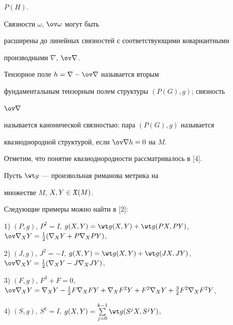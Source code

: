 $P(H)$. 


Связности $\omega$, $\ov\omega$ могут быть 


расширены до линейных связностей с соответствующими ковариантными 


производными $\nabla$, $\ov\nabla$. 


 


\begin{defn} 


Тензорное поле $h=\nabla-\ov\nabla$ называется вторым 


фундаментальным тензорным полем структуры $(P(G),g)$; связность 


$\ov\nabla$ 


называется канонической связностью; пара $(P(G),g)$ называется 


квазиоднородной структурой, если $\ov\nabla h=0$ на $M$. 


\end{defn} 


 


Отметим, что понятие квазиоднородности рассматривалось в [4]. 


 


Пусть $\wt g$ --- произвольная риманова метрика на


множестве $M$, $X,Y\in\frak X(M)$. 


Следующие примеры можно найти в [2]:


 


1) $(P,g)$, $P^2=I$, $g(X,Y)=\wt g(X,Y)+\wt g(P X,P Y)$, $\ov\nabla_X 


Y=\frac{1}{2}(\nabla_X Y+P\nabla_X P Y)$,


 


2) $(J,g)$, $J^2=-I$, $g(X,Y)=\wt g(X,Y)+\wt g(J X,J Y)$, $\ov\nabla_X 


Y=\frac{1}{2}(\nabla_X Y-J\nabla_X J Y)$,


 


3) $(F,g)$, $F^3+F=0$, $\ov\nabla_X Y=\nabla_X Y-\frac{1}{2}F \nabla_X F 


Y+\nabla_X F^2Y+F^2\nabla_X Y+\frac{3}{2}F^2\nabla_X F^2Y$,


 


4) $(S,g)$, $S^k=I$, $g(X,Y)=\sum\limits^{k-1}_{j=0}\wt g(S^j X, S^j Y)$, 


